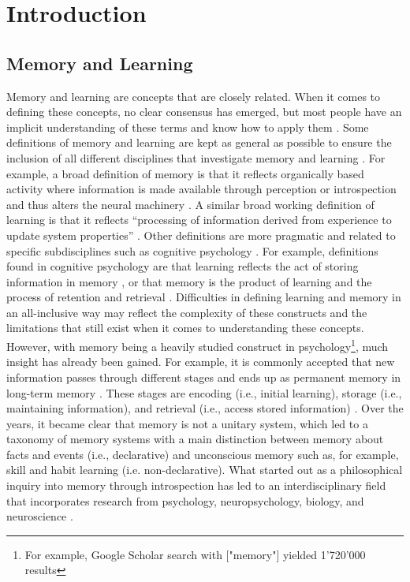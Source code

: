 \section{Introduction} \label{Introduction} 
\subsection{Memory and Learning}
Memory and learning are concepts that are closely related. When it comes to defining these concepts, no clear consensus has emerged, but most people have an implicit understanding of these terms and know how to apply them \parencite[]{dehouwerWhatLearningNature2013, kleinWhatMemory2015}. Some definitions of memory and learning are kept as general as possible to ensure the inclusion of all different disciplines that investigate memory and learning \parencite{barronEmbracingMultipleDefinitions2015, kleinWhatMemory2015}. For example, a broad definition of memory is that it reflects organically based activity where information is made available through perception or introspection and thus alters the neural machinery \parencite{kleinWhatMemory2015}. A similar broad working definition of learning is that it reflects “processing of information derived from experience to update system properties” \parencite[page. 405]{barronEmbracingMultipleDefinitions2015}. Other definitions are more pragmatic and related to specific subdisciplines such as cognitive psychology \parencite[see,][]{barronEmbracingMultipleDefinitions2015}. For example, definitions found in cognitive psychology are that learning reflects the act of storing information in memory \parencite{medinCognitivePsychology1992}, or that memory is the product of learning and the process of retention and retrieval \parencite{crowderPrinciplesLearningMemory1976}. Difficulties in defining learning and memory in an all-inclusive way may reflect the complexity of these constructs and the limitations that still exist when it comes to understanding these concepts. However, with memory being a heavily studied construct in psychology\footnote{For example, Google Scholar search with ["memory"] yielded 1'720'000 results}, much insight has already been gained.  
For example, it is commonly accepted that new information passes through different stages and ends up as permanent memory in long-term memory \parencite{abenDistinctionWorkingMemory2012}. These stages are encoding (i.e., initial learning), storage (i.e., maintaining information), and retrieval (i.e., access stored information) \parencite{meltonImplicationsShorttermMemory1963}. 
Over the years, it became clear that memory is not a unitary system, which led to a taxonomy of memory systems with a main distinction between memory about facts and events (i.e., declarative) and unconscious memory such as, for example, skill and habit learning (i.e. non-declarative)\parencite{cohenPreservedLearningRetention1980, squireMechanismsMemory1986, squireMemorySystemsBrain2004}. What started out as a philosophical inquiry into memory through introspection \parencite{kahanaFoundationsHumanMemory2012} has led to an interdisciplinary field that incorporates research from psychology, neuropsychology, biology, and neuroscience \parencite{kahanaFoundationsHumanMemory2012, polsterCognitiveNeuroscienceAnalyses1991, squireMemoryBrainSystems2009}.
